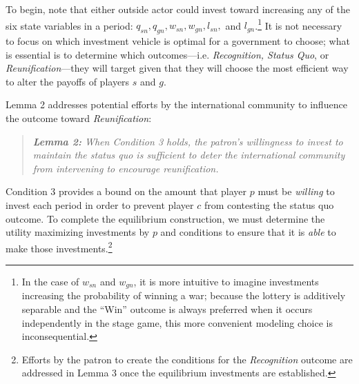 \documentclass[12pt]{article}
\begin{document}
To begin, note that either outside actor could invest toward increasing any of the six state variables in a period: $q_{sn},q_{gn},w_{sn},w_{gn},l_{sn},$ and $l_{gn}$.\footnote{In the case of $w_{sn}$ and $w_{gn}$, it is more intuitive to imagine investments increasing the probability of winning a war; because the lottery is additively separable and the ``Win'' outcome is always preferred when it occurs independently in the stage game, this more convenient modeling choice is inconsequential.} It is not necessary to focus on which investment vehicle is optimal for a government to choose; what is essential is to determine which outcomes---i.e. \emph{Recognition, Status Quo}, or \emph{Reunification}---they will target given that they will choose the most efficient way to alter the payoffs of players $s$ and $g$.


Lemma 2 addresses potential efforts by the international community to influence the outcome toward \emph{Reunification}:

\begin{quotation}
\noindent \textit{{\bf Lemma 2:} When Condition 3 holds, the patron's willingness to invest to maintain the status quo is sufficient to deter the international community from intervening to encourage reunification.}
\end{quotation}

\noindent Condition 3 provides a bound on the amount that player $p$ must be \emph{willing} to invest each period in order to prevent player $c$ from contesting the status quo outcome. To complete the equilibrium construction, we must determine the utility maximizing investments by $p$ and conditions to ensure that it is \emph{able} to make those investments.\footnote{Efforts by the patron to create the conditions for the \emph{Recognition} outcome are addressed in Lemma 3 once the equilibrium investments are established.}
\end{document}
